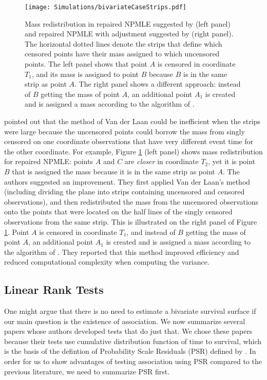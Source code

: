 \documentclass[]{article}
\begin{document}
\begin{figure}[!h]
\caption[Mass redistribution in repaired NPMLE suggested by \cite{van1996efficient} (left panel) and repaired NPMLE with adjustment suggested by \cite{moodie2005adjustment} (right panel).]{Mass redistribution in repaired NPMLE suggested by \cite{van1996efficient} (left panel) and repaired NPMLE with adjustment suggested by \cite{moodie2005adjustment} (right panel). The horizontal dotted lines denote the strips that define which censored points have their mass assigned to which uncensored points. The left panel shows that point $A$ is censored in coordinate $T_1$, and its mass is assigned to point $B$ because $B$ is in the same strip as point $A$. The right panel shows a different approach: instead of $B$ getting the mass of point $A$, an additional point $A_1$ is created and is assigned a mass according to the algorithm of \cite{moodie2005adjustment}.}
\texttt{[image: Simulations/bivariateCaseStrips.pdf]}
\label{fig:bcMoodie}
\end{figure}

\cite{moodie2005adjustment} pointed out that the method of Van der Laan could be inefficient when the strips were large because the uncensored points could borrow the mass from singly censored on one coordinate observations that have very different event time for the other coordinate. For example, Figure \ref{fig:bcMoodie} (left panel) shows mass redistribution for repaired NPMLE: points $A$ and $C$ are \emph{closer} in coordinate $T_2$, yet it is point $B$ that is assigned the mass because it is in the same strip as point $A$. The authors suggested an improvement. They first applied Van der Laan's method (including dividing the plane into strips containing uncensored and censored observations), and then redistributed the mass from the uncensored observations onto the points that were located on the half lines of the singly censored observations from the same strip. This is illustrated on the right panel of Figure \ref{fig:bcMoodie}. Point $A$ is censored in coordinate $T_1$, and instead of $B$ getting the mass of point $A$, an additional point $A_1$ is created and is assigned a mass according to the algorithm of \cite{moodie2005adjustment}. They reported that this method improved efficiency and reduced computational complexity when computing the variance.

\subsection{Linear Rank Tests}
One might argue that there is no need to estimate a bivariate survival surface if our main question is the existence of association. We now summarize several papers whose authors developed tests that do just that. We chose these papers because their tests use cumulative distribution function of time to survival, which is the basis of the defintion of Probability Scale Residuals (PSR) defined by \cite{li2012new}. In order for us to show advantages of testing association using PSR compared to the previous literature, we need to summarize PSR first.
\end{document}
